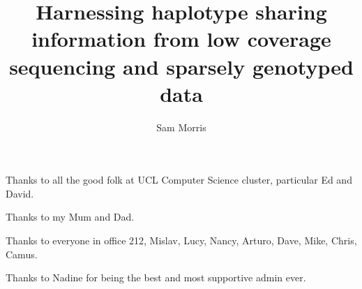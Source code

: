 
\title{Harnessing haplotype sharing information from low coverage sequencing and sparsely genotyped data }
\author{Sam Morris}

\maketitle
\makedeclaration

\begin{abstract} %
\end{abstract}

\begin{acknowledgements}
Thanks to all the good folk at UCL Computer Science cluster, particular Ed and David.

Thanks to my Mum and Dad. 

Thanks to everyone in office 212, Mislav, Lucy, Nancy, Arturo, Dave, Mike, Chris, Camus. 

Thanks to Nadine for being the best and most supportive admin ever. 
\end{acknowledgements}

\setcounter{tocdepth}{2} 

\tableofcontents
\listoffigures
\listoftables

